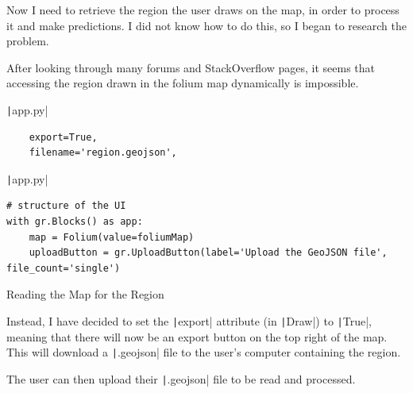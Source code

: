 \documentclass[12pt]{report}
\newcommand{\pil}[1]{\protect\texttt|#1|}
\begin{document}
\begin{center}
\end{center}

Now I need to retrieve the region the user draws on the map, in order to process it and make predictions. I did not know how to do this, so I began to research the problem.

After looking through many forums and StackOverflow pages, it seems that accessing the region drawn in the folium map dynamically is impossible.

\begin{listing}[H]
\pil{app.py}
\begin{verbatim}
    export=True,
    filename='region.geojson',
\end{verbatim}
\pil{app.py}
\begin{verbatim}
# structure of the UI
with gr.Blocks() as app:
    map = Folium(value=foliumMap)
    uploadButton = gr.UploadButton(label='Upload the GeoJSON file', file_count='single')
\end{verbatim}
\caption{Reading the Map for the Region}\label{cs:readingMapForRegion}
\end{listing}

Instead, I have decided to set the \pil{export} attribute (in \pil{Draw}) to \pil{True}, meaning that there will now be an export button on the top right of the map. This will download a \pil{.geojson} file to the user's computer containing the region.

The user can then upload their \pil{.geojson} file to be read and processed.
\end{document}
